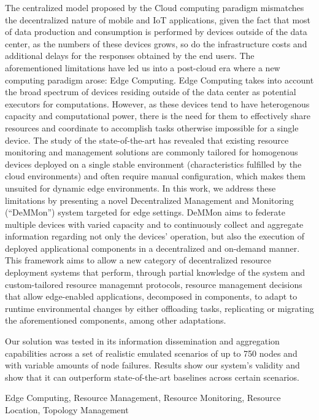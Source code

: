 

The centralized model proposed by the Cloud computing paradigm mismatches the decentralized nature of mobile and IoT applications, given the fact that most of data production and consumption is performed by devices outside of the data center, as the numbers of these devices grows, so do the infrastructure costs and additional delays for the responses obtained by the end users. The aforementioned limitations have led us into a post-cloud era where a new computing paradigm arose: Edge Computing. Edge Computing takes into account the broad spectrum of devices residing outside of the data center as potential executors for computations. However, as these devices tend to have heterogenous capacity and computational power, there is the need for them to effectively share resources and coordinate to accomplish tasks otherwise impossible for a single device. 
The study of the state-of-the-art has revealed that existing resource monitoring and management solutions are commonly tailored for homogenous devices deployed on a single stable environment (characteristics fulfilled by the cloud environments) and often require manual configuration, which makes them unsuited for dynamic edge environments. In this work, we address these limitations by presenting a novel Decentralized Management and Monitoring (``DeMMon'') system targeted for edge settings. DeMMon aims to federate multiple devices with varied capacity and to continuously collect and aggregate information regarding not only the devices' operation, but also the execution of deployed applicational components in a decentralized and on-demand manner. This framework aims to allow a new category of decentralized resource deployment systems that perform, through partial knowledge of the system and custom-tailored resource managemnt protocols, resource management decisions that allow edge-enabled applications, decomposed in components, to adapt to runtime environmental changes by either offloading tasks, replicating or migrating the aforementioned components, among other adaptations.

Our solution was tested in its information dissemination and aggregation capabilities across a set of realistic emulated scenarios of up to 750 nodes and with variable amounts of node failures. Results show our system's validity and show that it can outperform state-of-the-art baselines across certain scenarios. 


\begin{keywords}
  Edge Computing, Resource Management, Resource Monitoring, Resource Location, Topology Management
\end{keywords} 

